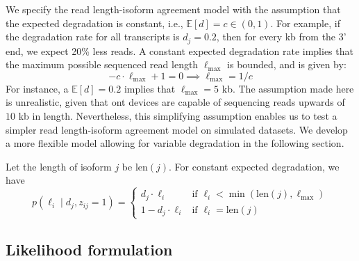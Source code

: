 We specify the read length-isoform agreement model with the assumption that the expected degradation is constant, i.e., $\mathbb{E}[d]=c\in(0,1)$. For example, if the degradation rate for all transcripts is $d_j=0.2$, then for every kb from the 3' end, we expect 20\% less reads. A constant expected degradation rate  implies that the maximum possible sequenced read length $\ell_\mathrm{max}$ is bounded, and is given by:
\begin{equation}
    -c\cdot \ell_\mathrm{max} + 1 = 0 \implies \ell_\mathrm{max} = 1/c
\end{equation}
For instance, a $\mathbb{E}[d]=0.2$ implies that $\ell_\mathrm{max}=5$ kb. The assumption made here is unrealistic, given that \gls{ont} devices are capable of sequencing reads upwards of $10$ kb in length. Nevertheless, this simplifying assumption enables us to test a simpler read length-isoform agreement model on simulated datasets. We develop a more flexible model allowing for variable degradation in the following section.  

Let the length of isoform $j$ be len$(j)$. For constant expected degradation, we have
\begin{equation}
    p(\ell_i\mid d_j, z_{ij}=1) = 
    \begin{cases}
        d_j\cdot\ell_i & \textrm{if } \ell_i<\min(\mathrm{len}(j), \ell_\mathrm{max})\\
        1-d_j\cdot\ell_i & \textrm{if } \ell_i=\mathrm{len}(j)
    \end{cases}
\end{equation}

\subsection{Likelihood formulation}\label{sec:likelihood-formulation}

